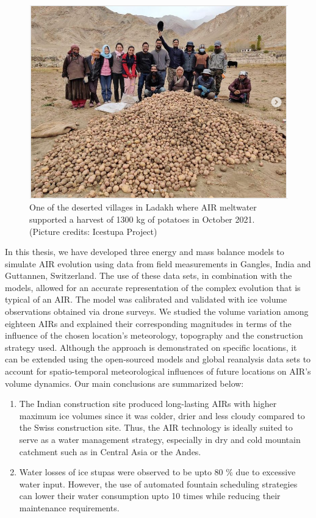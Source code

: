 \begin{figure}[htb]
	\includegraphics[width=\textwidth]{figs/Kullum_potatoes}
	\caption{One of the deserted villages in Ladakh where AIR meltwater supported a harvest of 1300 kg of
		potatoes in October 2021. (Picture credits: Icestupa Project)}
	\label{fig:kullum_potatoes}
\end{figure}

In this thesis, we have developed three energy and mass balance models to simulate AIR evolution using data from
field measurements in Gangles, India and Guttannen, Switzerland. The use of these data sets, in combination with
the models, allowed for an accurate representation of the complex evolution that is typical of an AIR. The model
was calibrated and validated with ice volume observations obtained via drone surveys. We studied the volume
variation among eighteen AIRs and explained their corresponding magnitudes in terms of the influence of the
chosen location's meteorology, topography and the construction strategy used. Although the approach is
demonstrated on specific locations, it can be extended using the open-sourced models and global reanalysis data
sets to account for spatio-temporal meteorological influences of future locations on AIR's volume dynamics. Our
main conclusions are summarized below:

\begin{enumerate}

  \item The Indian construction site produced long-lasting AIRs with higher maximum ice volumes since it was
    colder, drier and less cloudy compared to the Swiss construction site. Thus, the AIR technology is ideally
    suited to serve as a water management strategy, especially in dry and cold mountain catchment such as in
    Central Asia or the Andes.

  \item Water losses of ice stupas were observed to be upto 80 \% due to excessive water input. However, the use
    of automated fountain scheduling strategies can lower their water consumption upto 10 times while reducing
    their maintenance requirements.

\end{enumerate}



